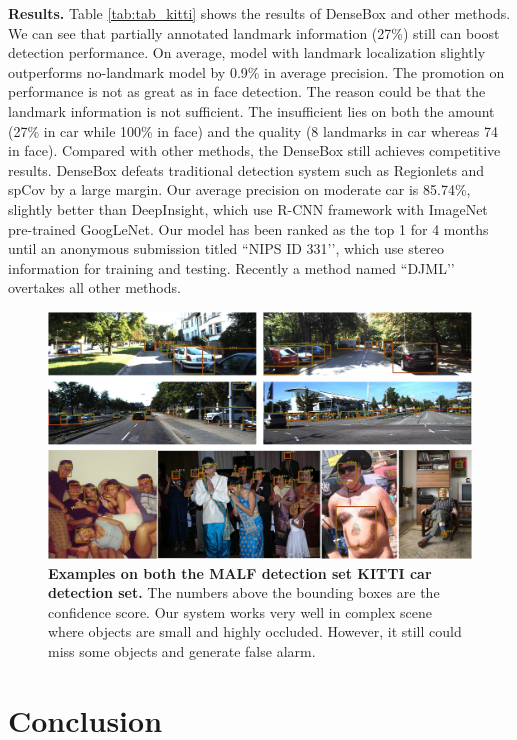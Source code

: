 \textbf{Results.} Table \ref{tab:tab_kitti} shows the results of DenseBox and other methods. We can see that partially annotated landmark information (27\%) still can boost detection performance. On average, model with landmark localization slightly outperforms no-landmark model by 0.9\% in average precision.  The promotion on performance is not as great as in face detection.  The reason could be that the landmark information is not sufficient.  The insufficient lies on both the amount (27\% in car while 100\% in face) and the quality (8 landmarks in car whereas 74 in face). Compared with other methods, the DenseBox still achieves competitive results.  DenseBox defeats traditional detection system such as Regionlets and spCov by a large margin. Our average precision on moderate car is 85.74\%, slightly better than DeepInsight, which use R-CNN framework with ImageNet pre-trained GoogLeNet\cite{szegedy2014going}.  Our model has been ranked as the top 1 for 4 months until an anonymous submission titled  ``NIPS ID 331’’, which use stereo information for training and testing. Recently a method named ``DJML’’ overtakes all other methods. 

	\begin{figure}[!hbtp]
	\centering
	 \includegraphics[scale=0.4]{figures/figure5-crop.pdf}
	\caption{\textbf{Examples on both the MALF detection set KITTI car detection set. }The numbers above the bounding boxes are the confidence score. Our system works very well in complex scene where objects are small and highly occluded. However, it still could miss some objects and generate false alarm.     }
	\label{fig:fig_case}
	\end{figure}
\section{Conclusion}

